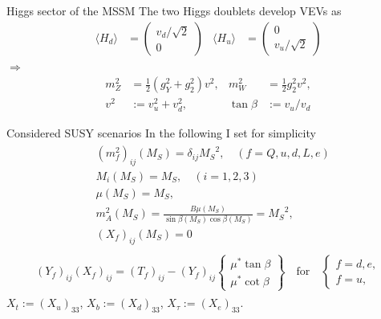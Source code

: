\documentclass[hyperref={pdfpagelabels=false},ngerman]{beamer}
\newcommand{\MS}{\ensuremath{M_S}}
\begin{document}
\begin{frame}{Higgs sector of the MSSM}
  The two Higgs doublets develop VEVs as
  \begin{align*}
    \langle H_d \rangle &=
    \begin{pmatrix}
      v_d / \sqrt{2} \\ 0
    \end{pmatrix} &
    \langle H_u \rangle &=
    \begin{pmatrix}
      0 \\ v_u / \sqrt{2}
    \end{pmatrix}
  \end{align*}
  $\Rightarrow$
  \begin{align*}
    m_Z^2 &= \frac{1}{2} (g_Y^2 + g_2^2) v^2, &
    m_W^2 &= \frac{1}{2} g_2^2 v^2, \\
    v^2 &:= v_u^2 + v_d^2, & \tan\beta &:= v_u/v_d
  \end{align*}
\end{frame}

\begin{frame}{Considered SUSY scenarios}
  In the following I set for simplicity
  \begin{align*}
    \begin{split}
      &(m_f^2)_{ij}(\MS) = \delta_{ij} \MS^2, \quad (f=Q,u,d,L,e) \\
      &M_i(\MS) = \MS, \quad (i = 1,2,3) \\
      &\mu(\MS) = \MS , \\
      &m_A^2(\MS) = \frac{B\mu(\MS)}{\sin\beta(\MS) \cos\beta(\MS)} = \MS^2 , \\
      &(X_f)_{ij}(\MS) = 0
    \end{split}
  \end{align*}
  \begin{align*}
    \begin{split}
      (Y_f)_{ij} (X_f)_{ij} = (T_f)_{ij} -  (Y_f)_{ij}
      \begin{Bmatrix}
        \mu^*\tan\beta \\ \mu^*\cot\beta
      \end{Bmatrix}
       \quad \text{for} \quad \left\{
        \begin{array}{l}\!\!f = d, e, \\ \!\!f = u,
        \end{array}
      \right.
    \end{split}
  \end{align*}
  $X_t := (X_u)_{33}$, $X_b := (X_d)_{33}$, $X_\tau := (X_e)_{33}$.
\end{frame}
\end{document}
